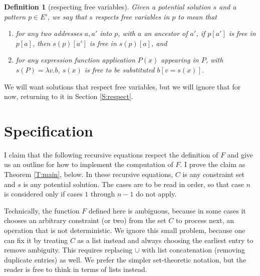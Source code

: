\documentclass{article}
\newtheorem{dfn}{Definition}
\begin{document}
\begin{dfn}[respecting free variables]\label{D:respect}
Given a potential solution $s$ and a pattern $p\in E'$, we say that \emph{$s$ respects free variables in $p$} to mean that
\begin{enumerate}
\item	for any two addresses $a,a'$ into $p$, with $a$ an ancestor of $a'$, if $p[a']$ is free in $p[a]$, then $s(p)[a']$ is free in $s(p)[a]$, and
\item	for any expression function application $P(x)$ appearing in $P$, with $s(P)=\lambda v.b$, $s(x)$ is free to be substituted $b[v=s(x)]$.
\end{enumerate}
\end{dfn}

We will want solutions that respect free variables, but we will ignore that for now, returning to it in Section \ref{S:respect}.

\section{Specification}\label{S:spec}%

I claim that the following recursive equations respect the definition of $F$ and give us an outline for how to implement the computation of $F$.  I prove the claim as Theorem \ref{T:main}, below.  In these recursive equations, $C$ is any constraint set and $s$ is any potential solution.  The cases are to be read in order, so that case $n$ is considered only if cases $1$ through $n-1$ do not apply.

Technically, the function $F$ defined here is ambiguous, because in some cases it chooses an arbitrary constraint (or two) from the set $C$ to process next, an operation that is not deterministic.  We ignore this small problem, because one can fix it by treating $C$ as a list instead and always choosing the earliest entry to remove ambiguity.  This requires replacing $\cup$ with list concatenation (removing duplicate entries) as well.  We prefer the simpler set-theoretic notation, but the reader is free to think in terms of lists instead.
\end{document}
